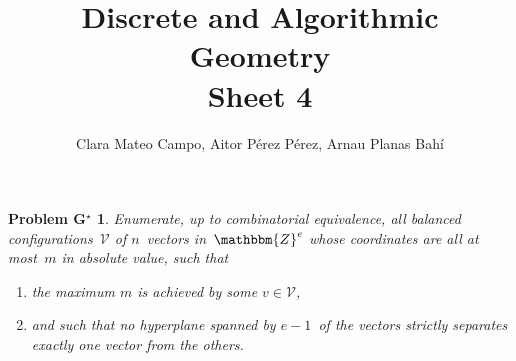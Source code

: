 \documentclass[11pt]{article}
\title{Discrete and Algorithmic Geometry \\Sheet 4}
\author{Clara Mateo Campo, Aitor Pérez Pérez, Arnau Planas Bah\'i}
\date{}
\newcommand{\Z}{\mathbbm{Z}}
\newcommand{\VV}{\mathcal{V}}
\newtheorem*{problemG*}{Problem G$^\star$}
\begin{document}
\maketitle

\begin{problemG*}
Enumerate, up to combinatorial equivalence, all balanced   configurations~$\VV$ of $n$~vectors in~$\Z^e$ whose coordinates are   all at most~$m$ in absolute value, such that
\begin{enumerate}
\item the maximum $m$ is achieved by some $v\in\VV$, 
\item and such that no hyperplane spanned by $e-1$~of the vectors   strictly separates exactly one vector from the others.
\end{enumerate}
\end{problemG*}
\end{document}
